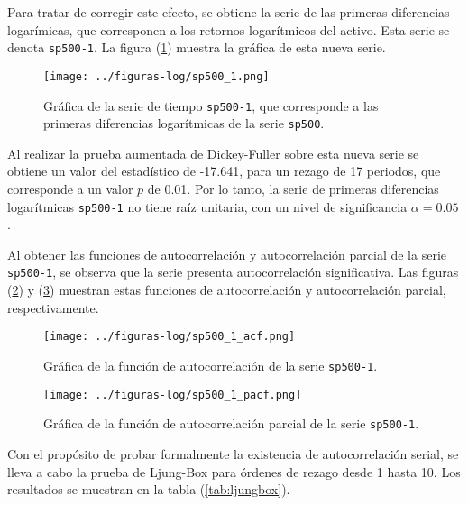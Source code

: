 \documentclass{article}
\begin{document}
Para tratar de corregir este efecto, se obtiene la serie de las primeras diferencias logarímicas, que corresponen a los retornos logarítmicos del activo. Esta serie se denota \texttt{sp500-1}. La figura (\ref{fig:sp500_1}) muestra la gráfica de esta nueva serie.

\begin{figure}[H]
\centering
\texttt{[image: ../figuras-log/sp500\_1.png]}
\caption{\label{fig:sp500_1}Gráfica de la serie de tiempo \texttt{sp500-1}, que corresponde a las primeras diferencias logarítmicas de la serie \texttt{sp500}.}
\end{figure}

Al realizar la prueba aumentada de Dickey-Fuller sobre esta nueva serie se obtiene un valor del estadístico de -17.641, para un rezago de 17 periodos, que corresponde a un valor $p$ de 0.01. Por lo tanto, la serie de primeras diferencias logarítmicas \texttt{sp500-1} no tiene raíz unitaria, con un nivel de significancia $\alpha = 0.05$.

Al obtener las funciones de autocorrelación y autocorrelación parcial de la serie \texttt{sp500-1}, se observa que la serie presenta autocorrelación significativa. Las figuras (\ref{fig:sp500_1_acf}) y (\ref{fig:sp500_1_pacf}) muestran estas funciones de autocorrelación y autocorrelación parcial, respectivamente.

\begin{figure}[H]
\centering
\texttt{[image: ../figuras-log/sp500\_1\_acf.png]}
\caption{\label{fig:sp500_1_acf}Gráfica de la función de autocorrelación de la serie \texttt{sp500-1}.}
\end{figure}

\begin{figure}[H]
\centering
\texttt{[image: ../figuras-log/sp500\_1\_pacf.png]}
\caption{\label{fig:sp500_1_pacf}Gráfica de la función de autocorrelación parcial de la serie \texttt{sp500-1}.}
\end{figure}

Con el propósito de probar formalmente la existencia de autocorrelación serial, se lleva a cabo la prueba de Ljung-Box para órdenes de rezago desde 1 hasta 10. Los resultados se muestran en la tabla (\ref{tab:ljungbox}).
\end{document}

